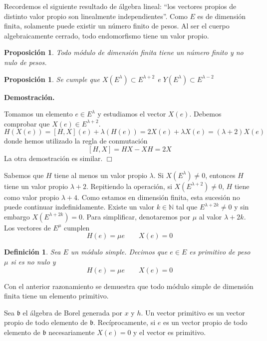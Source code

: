 \documentclass[a4paper,draft,12pt]{article}
\newtheorem{defi}{Definición}[section]%
\newtheorem{propo}[teo]{Proposición}%
\newcommand{\dem}{\noindent \textbf{Demostración. }\vspace{0.3 cm}}%
\newcommand{\N}{\mathbb{N}}%
\newcommand{\fin}{ $\Box $ \vspace{0.4 cm}}
\newcommand{\df}[1]{\textsf{\color{blue}#1}}
\begin{document}
Recordemos el siguiente resultado de álgebra lineal:  ``los vectores propios de distinto valor propio son linealmente independientes''.  Como  $E$ es de dimensión finita, solamente puede existir un número finito de pesos.  Al ser el cuerpo algebraicamente cerrado, todo endomorfismo tiene un valor propio.

\begin{propo}

Todo módulo de dimensión finita tiene un número  finito y no nulo de pesos.

\end{propo}


\begin{propo}

Se cumple que $X(E^\lambda)\subset E^{\lambda+2}$ e $Y(E^\lambda) \subset E^{\lambda-2}$

\end{propo}

\dem

Tomamos un elemento $e \in E^\lambda$ y estudiamos el vector $X(e)$.  Debemos comprobar que $X(e) \in E^{\lambda+2}$.
$$
H(X(e))= [H,X](e)+\lambda(H(e))= 2X(e)+\lambda X(e)= (\lambda+2) X(e)
$$
donde hemos utilizado la regla de conmutación
$$
[H,X]= HX-XH=2X
$$
La otra demostración es similar. \fin

Sabemos que $H$ tiene al menos un valor propio $\lambda$. Si $X(E^\lambda)\neq 0$, entonces $H$ tiene un valor propio $\lambda +2$.  Repitiendo la operación, si $X(E^{\lambda+2}) \neq 0$, $H$ tiene como valor propio $\lambda +4$. Como estamos en dimensión finita, esta sucesión no puede continuar indefinidamente. Existe un valor $k \in \N$ tal que $E^{\lambda+2k} \neq 0$ y sin embargo $X(E^{\lambda+2k})=0$.  Para simplificar, denotaremos por $\mu$ al valor  $\lambda +2k$.  Los vectores de $E^\mu$ cumplen
$$
H(e)=\mu e\qquad X(e)=0
$$

\begin{defi}

Sea $E$ un módulo simple.  Decimos que $e \in E $ es  \df{primitivo} de peso $\mu$ si es no nulo y 
$$
H(e)= \mu e \qquad X(e)=0
$$

\end{defi}

Con el anterior razonamiento se demuestra que todo módulo simple de dimensión finita tiene un elemento primitivo.

\bigskip


Sea $\mathfrak{b}$ el álgebra de Borel generada por $x$ y $h$.  Un vector primitivo es un vector propio de todo elemento de $\mathfrak{b}$.  Recíprocamente, si $e $ es un vector propio de todo elemento de $\mathfrak{b}$ necesariamente $X(e)=0$ y el vector es primitivo.
\end{document}
